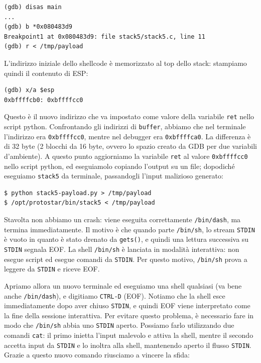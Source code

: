 \begin{mdframed}[backgroundcolor=white!20,shadow=false]
\begin{lstlisting}
(gdb) disas main
...
(gdb) b *0x080483d9
Breakpoint1 at 0x080483d9: file stack5/stack5.c, line 11
(gdb) r < /tmp/payload
\end{lstlisting}
\end{mdframed}
L'indirizzo iniziale dello shellcode è memorizzato al top dello stack: stampiamo quindi il contenuto di ESP:

\begin{mdframed}[backgroundcolor=white!20,shadow=false]
\begin{lstlisting}
(gdb) x/a $esp
0xbffffcb0: 0xbffffcc0
\end{lstlisting}
\end{mdframed}
Questo è il nuovo indirizzo che va impostato come valore della variabile \texttt{ret} nello script python. Confrontando gli indirizzi di \texttt{buffer}, abbiamo che nel terminale l'indirizzo era \texttt{0xbffffcc0}, mentre nel debugger era \texttt{0xbffffca0}. La differenza è di 32 byte (2 blocchi da 16 byte, ovvero lo spazio creato da GDB per due variabili d'ambiente). A questo punto aggiorniamo la variabile \texttt{ret} al valore \texttt{0xbffffcc0} nello script python, ed eseguiamolo copiando l'output su un file; dopodiché eseguiamo \texttt{stack5} da terminale, passandogli l'input malizioso generato:

\begin{mdframed}[backgroundcolor=white!20,shadow=false]
\begin{lstlisting}
$ python stack5-payload.py > /tmp/payload
$ /opt/protostar/bin/stack5 < /tmp/payload
\end{lstlisting}
\end{mdframed}
Stavolta non abbiamo un crash: viene eseguita correttamente \texttt{/bin/dash}, ma termina immediatamente. Il motivo è che quando parte \texttt{/bin/sh}, lo stream \texttt{STDIN} è vuoto in quanto è stato drenato da \texttt{gets()}, e quindi una lettura successiva su \texttt{STDIN} segnala EOF. La shell \texttt{/bin/sh} è lanciata in modalità interattiva: non esegue script ed esegue comandi da \texttt{STDIN}. Per questo motivo, \texttt{/bin/sh} prova a leggere da \texttt{STDIN} e riceve EOF.

Apriamo allora un nuovo terminale ed eseguiamo una shell qualsiasi (va bene anche \texttt{/bin/dash}), e digitiamo \texttt{CTRL-D} (EOF). Notiamo che la shell esce immediatamente dopo aver chiuso \texttt{STDIN}, e quindi EOF viene interpretato come la fine della sessione interattiva. Per evitare questo problema, è necessario fare in modo che \texttt{/bin/sh} abbia uno \texttt{STDIN} aperto. Possiamo farlo utilizzando due comandi \texttt{cat}: il primo inietta l'input malevolo e attiva la shell, mentre il secondo accetta input da \texttt{STDIN} e lo inoltra alla shell, mantenendo aperto il flusso \texttt{STDIN}. Grazie a questo nuovo comando riusciamo a vincere la sfida:

